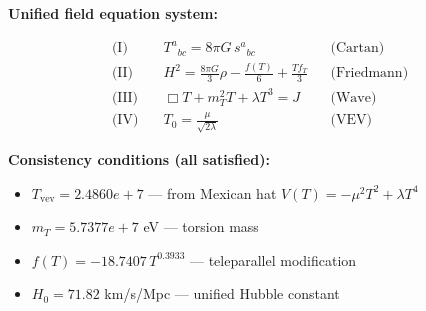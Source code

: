 
\textbf{Unified field equation system:}

\begin{align}
  \text{(I)} \quad & T^a{}_{bc} = 8\pi G \, s^a{}_{bc} && \text{(Cartan)} \\
  \text{(II)} \quad & H^2 = \frac{8\pi G}{3}\rho - \frac{f(T)}{6} + \frac{Tf_T}{3} && \text{(Friedmann)} \\
  \text{(III)} \quad & \Box T + m_T^2 T + \lambda T^3 = J && \text{(Wave)} \\
  \text{(IV)} \quad & T_0 = \frac{\mu}{\sqrt{2\lambda}} && \text{(VEV)}
\end{align}

\textbf{Consistency conditions (all satisfied):}
\begin{itemize}
  \item $T_{\text{vev}} = 2.4860e+7$ — from Mexican hat $V(T) = -\mu^2 T^2 + \lambda T^4$
  \item $m_T = 5.7377e+7$ eV — torsion mass
  \item $f(T) = -18.7407 \, T^{0.3933}$ — teleparallel modification
  \item $H_0 = 71.82$ km/s/Mpc — unified Hubble constant
\end{itemize}